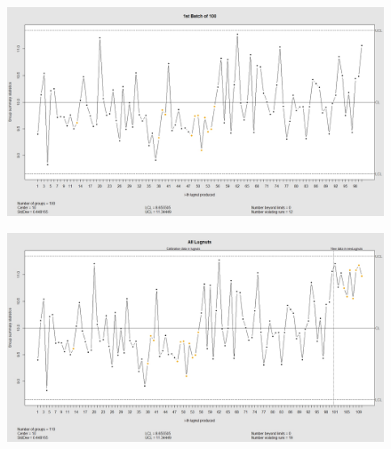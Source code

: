 \documentclass[]{report}
\begin{document}
		\newpage
		\begin{figure}[h!]
			\centering
			\includegraphics[width=0.8\linewidth]{images/lugnuts1}
			\caption{}
			\label{fig:lugnuts1}
		\end{figure}
		\begin{figure}[h!]
			\centering
			\includegraphics[width=0.8\linewidth]{images/lugnuts2}
			\caption{}
			\label{fig:lugnuts2}
		\end{figure}
		\newpage
\end{document}
